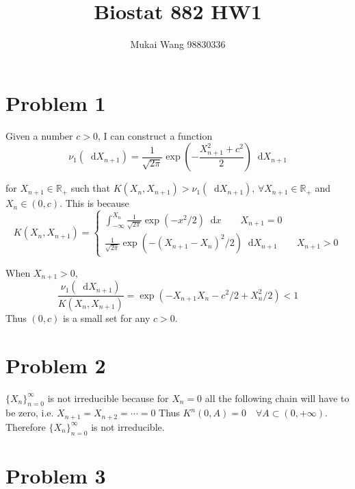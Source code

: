 \documentclass[12pt]{article}
\title{Biostat 882 HW1}
\date{}
\author{Mukai Wang 98830336}
\newcommand*\diff{\mathop{}\!\mathrm{d}}
\begin{document}
\maketitle


\section*{Problem 1}

Given a number $c>0$, I can construct a function
\[\nu_1(\diff X_{n+1}) = \frac{1}{\sqrt{2\pi}} \exp (-\frac{X_{n+1}^2+c^2}{2})\diff X_{n+1} \]

for $X_{n+1} \in  \mathbb{R}_+$ such that $K(X_n, X_{n+1}) > \nu_1(\diff X_{n+1})$,
 $\forall X_{n+1} \in \mathbb{R}_{+}$ and $X_n \in (0, c)$. This is because
 $$K(X_n, X_{n+1}) = \begin{cases}
 	\int_{-\infty}^{X_n}\frac{1}{\sqrt{2\pi}} \exp(-x^2 /2)\diff x \qquad X_{n+1} = 0\\
 	\frac{1}{\sqrt{2\pi}} \exp(-(X_{n+1}-X_n)^2/2)\diff X_{n+1}\qquad X_{n+1} > 0
 \end{cases}
  $$
  
  When $X_{n+1} > 0$, 
  \[ \frac{\nu_1(\diff X_{n+1})}{K(X_n, X_{n+1})} = \exp(-X_{n+1}X_n - c^2/2 + X_{n}^2/2) < 1\]
  Thus $(0, c)$ is a small set for any $c>0$.
\section*{Problem 2}
 $\{X_n \}_{n=0}^{\infty}$ is not irreducible because for $X_n=0$ all the following chain will have to be zero, i.e. $X_{n+1} = X_{n+2} =\cdots =0$
 Thus $K^n (0, A) = 0 \quad \forall A\subset (0, +\infty)$. Therefore $\{X_n \}_{n=0}^{\infty}$ is not irreducible.

\section*{Problem 3}
\end{document}
